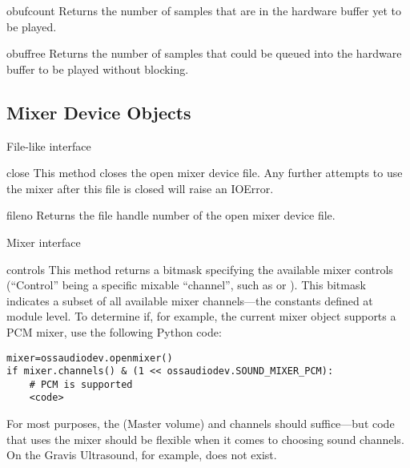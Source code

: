 \begin{methoddesc}{obufcount}{}
Returns the number of samples that are in the hardware buffer yet to be
played.
\end{methoddesc}

\begin{methoddesc}{obuffree}{}
Returns the number of samples that could be queued into the hardware
buffer to be played without blocking.
\end{methoddesc}

\subsection{Mixer Device Objects \label{mixer-device-objects}}

File-like interface

\begin{methoddesc}{close}{}
This method closes the open mixer device file.  Any further attempts to
use the mixer after this file is closed will raise an IOError.
\end{methoddesc}

\begin{methoddesc}{fileno}{}
Returns the file handle number of the open mixer device file.
\end{methoddesc}

Mixer interface

\begin{methoddesc}{controls}{}
This method returns a bitmask specifying the available mixer controls
(``Control'' being a specific mixable ``channel'', such as
 or ).  This
bitmask indicates a subset of all available mixer channels---the
 constants defined at module level.  To determine if,
for example, the current mixer object supports a PCM mixer, use the
following Python code:

\begin{verbatim}
mixer=ossaudiodev.openmixer()
if mixer.channels() & (1 << ossaudiodev.SOUND_MIXER_PCM):
	# PCM is supported
	<code>
\end{verbatim}

For most purposes, the  (Master volume) and
 channels should suffice---but code that uses the
mixer should be flexible when it comes to choosing sound channels.  On
the Gravis Ultrasound, for example,  does not
exist.
\end{methoddesc}

